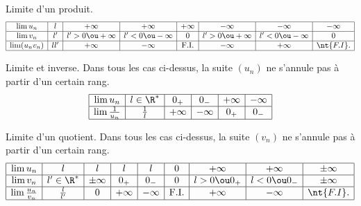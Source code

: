 \documentclass[11pt]{article}
\begin{document}
\begin{prop}{Limite d'un produit.}{}
    \begin{eqnarray*}
        \begin{array}{|c|c|c|c|c|c|c|c|}
            \hline
            \lim u_n & l & +\infty & + \infty & +\infty & -\infty & -\infty & -\infty\\
            \hline
            \lim v_n & l' & l'>0\ou+\infty&l'<0\ou-\infty&0&l'>0\ou+\infty&l'<0\ou-\infty&0\\
            \hline
            \lim(u_nv_n) & ll' & +\infty & -\infty & \text{F.I.} & -\infty & +\infty & \nt{F.I}.\\
            \hline
        \end{array}
    \end{eqnarray*}
\end{prop}

\begin{prop}{Limite et inverse.}{}
    Dans tous les cas ci-dessus, la suite $(u_n)$ ne s'annule pas à partir d'un certain rang.
    \begin{eqnarray*}
        \begin{array}{|c|c|c|c|c|c|}
            \hline
            \lim u_n & l\in\R^* & 0_+ & 0_- & +\infty & -\infty\\
            \hline
            \lim\frac{1}{u_n} & \frac{1}{l} & +\infty & -\infty & 0_+ & 0_-\\
            \hline
        \end{array}
    \end{eqnarray*}
\end{prop}

\begin{prop}{Limite d'un quotient.}{}
    Dans tous les cas ci-dessus, la suite $(v_n)$ ne s'annule pas à partir d'un certain rang.
    \begin{eqnarray*}
        \begin{array}{|c|c|c|c|c|c|c|c|c|c|}
            \hline
            \lim u_n & l & l & l & l & 0 & +\infty & +\infty & \pm \infty\\
            \hline
            \lim v_n & l'\in\R^* & \pm \infty & 0_+ & 0_- & 0 & l>0 \ou 0_+ & l < 0 \ou 0_- & \pm \infty\\
            \hline
            \lim\frac{u_n}{v_n} & \frac{l}{l'} & 0 & +\infty & -\infty & \text{F.I.} & +\infty & -\infty & \nt{F.I}.\\
            \hline
        \end{array}
    \end{eqnarray*}
\end{prop}
\end{document}
